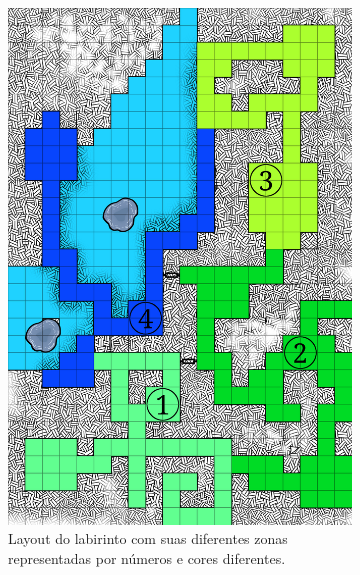 \begin{figure}[h!]
  \centering
  \begin{subfigure}[b]{0.45\linewidth}
    \includegraphics[width=\linewidth]{encounterZones.png}
     \caption{Layout do labirinto com suas diferentes zonas representadas por números e cores diferentes.}
  \end{subfigure}
  \begin{subfigure}[b]{0.45\linewidth}

\end{subfigure}
\end{figure}
